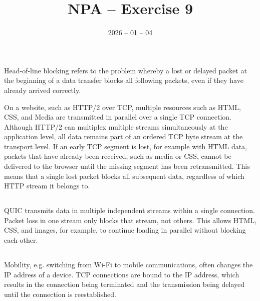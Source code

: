 \documentclass{article}
\date{2026 -- 01 -- 04}
\title{NPA -- Exercise 9}
\begin{document}
\maketitle
    
    \section{}
    \subsection{}

        Head-of-line blocking refers to the problem whereby a lost or delayed packet at the beginning of a data transfer blocks all following packets, even if they have already arrived correctly.

        On a website, such as HTTP/2 over TCP, multiple resources such as HTML, CSS, and Media are transmitted in parallel over a single TCP connection. Although HTTP/2 can multiplex multiple streams simultaneously at the application level, all data remains part of an ordered TCP byte stream at the transport level. If an early TCP segment is lost, for example with HTML data, packets that have already been received, such as media or CSS, cannot be delivered to the browser until the missing segment has been retransmitted. This means that a single lost packet blocks all subsequent data, regardless of which HTTP stream it belongs to.
    
    \subsection{}

        QUIC transmits data in multiple independent streams within a single connection. Packet loss in one stream only blocks that stream, not others. This allows HTML, CSS, and images, for example, to continue loading in parallel without blocking each other.
        
    \subsection{}

        Mobility, e.g. switching from Wi-Fi to mobile communications, often changes the IP address of a device. TCP connections are bound to the IP address, which results in the connection being terminated and the transmission being delayed until the connection is reestablished.
    
\end{document}
